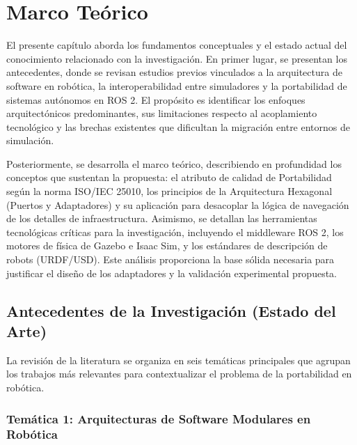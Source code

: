 \doublespacing

\chapter{Marco Teórico}

El presente capítulo aborda los fundamentos conceptuales y el estado actual del conocimiento relacionado con la investigación. En primer lugar, se presentan los antecedentes, donde se revisan estudios previos vinculados a la arquitectura de software en robótica, la interoperabilidad entre simuladores y la portabilidad de sistemas autónomos en ROS 2. El propósito es identificar los enfoques arquitectónicos predominantes, sus limitaciones respecto al acoplamiento tecnológico y las brechas existentes que dificultan la migración entre entornos de simulación.

Posteriormente, se desarrolla el marco teórico, describiendo en profundidad los conceptos que sustentan la propuesta: el atributo de calidad de Portabilidad según la norma ISO/IEC 25010, los principios de la Arquitectura Hexagonal (Puertos y Adaptadores) y su aplicación para desacoplar la lógica de navegación de los detalles de infraestructura. Asimismo, se detallan las herramientas tecnológicas críticas para la investigación, incluyendo el middleware ROS 2, los motores de física de Gazebo e Isaac Sim, y los estándares de descripción de robots (URDF/USD). Este análisis proporciona la base sólida necesaria para justificar el diseño de los adaptadores y la validación experimental propuesta.

\section{Antecedentes de la Investigación (Estado del Arte)}

\noindent La revisión de la literatura se organiza en seis temáticas principales que agrupan los trabajos más relevantes para contextualizar el problema de la portabilidad en robótica.

\subsection{Temática 1: Arquitecturas de Software Modulares en Robótica}

